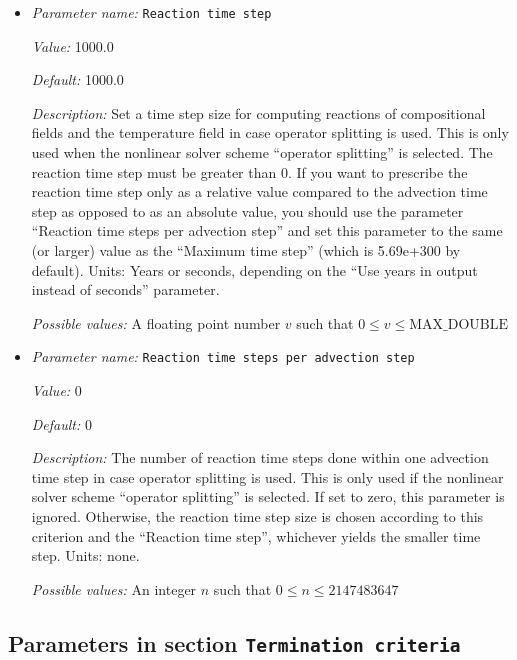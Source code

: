 \begin{itemize}
\item {\it Parameter name:} {\tt Reaction time step}
\label{parameters:Solver parameters/Operator splitting parameters/Reaction time step}


{\it Value:} 1000.0


{\it Default:} 1000.0


{\it Description:} Set a time step size for computing reactions of compositional fields and the temperature field in case operator splitting is used. This is only used when the nonlinear solver scheme ``operator splitting'' is selected. The reaction time step must be greater than 0. If you want to prescribe the reaction time step only as a relative value compared to the advection time step as opposed to as an absolute value, you should use the parameter ``Reaction time steps per advection step'' and set this parameter to the same (or larger) value as the ``Maximum time step'' (which is 5.69e+300 by default). Units: Years or seconds, depending on the ``Use years in output instead of seconds'' parameter.


{\it Possible values:} A floating point number $v$ such that $0 \leq v \leq \text{MAX\_DOUBLE}$
\item {\it Parameter name:} {\tt Reaction time steps per advection step}
\label{parameters:Solver parameters/Operator splitting parameters/Reaction time steps per advection step}


{\it Value:} 0


{\it Default:} 0


{\it Description:} The number of reaction time steps done within one advection time step in case operator splitting is used. This is only used if the nonlinear solver scheme ``operator splitting'' is selected. If set to zero, this parameter is ignored. Otherwise, the reaction time step size is chosen according to this criterion and the ``Reaction time step'', whichever yields the smaller time step. Units: none.


{\it Possible values:} An integer $n$ such that $0\leq n \leq 2147483647$
\end{itemize}

\subsection{Parameters in section \tt Termination criteria}
\label{parameters:Termination_20criteria}

